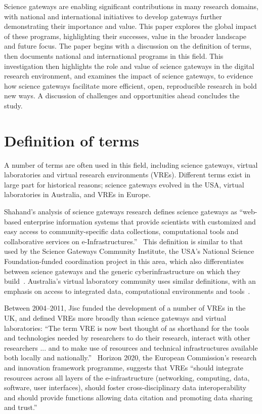 \documentclass[review]{elsarticle}
\begin{document}
Science gateways are enabling significant contributions in many research domains, with national and international initiatives to develop gateways further demonstrating their importance and value. 
This paper explores the global impact of these programs, highlighting their successes, value in the broader landscape and future focus. 
The paper begins with a discussion on the definition of terms, then documents national and international programs in this field. 
This investigation then highlights the role and value of science gateways in the digital research environment, and examines the impact of science gateways, to evidence how science gateways facilitate more efficient, open, reproducible research in bold new ways. 
A discussion of challenges and opportunities ahead concludes the study. 

\section{Definition of terms}

A number of terms are often used in this field, including science gateways, virtual laboratories and virtual research environments (VREs). Different terms exist in large part for historical reasons; science gateways evolved in the USA, virtual laboratories in Australia, and VREs in Europe. 

Shahand's analysis of science gateways research defines science gateways as ``web-based enterprise information systems that provide scientists with customized and easy access to community-specific data collections, computational tools and collaborative services on e-Infrastructures.''~\cite{shahand2015-1} This definition is similar to that used by the Science Gateways Community Institute, the USA's National Science Foundation-funded coordination project in this area, which also differentiates between science gateways and the generic cyberinfrastructure on which they build~\cite{what-is-sg-2}. Australia's virtual laboratory community uses similar definitions, with an emphasis on access to integrated data, computational environments and tools~\cite{nectar-impact-3}. 

Between 2004--2011, Jisc funded the development of a number of VREs in the UK, and defined VREs more broadly than science gateways and virtual laboratories: ``The term VRE is now best thought of as shorthand for the tools and technologies needed by researchers to do their research, interact with other researchers ... and to make use of resources and technical infrastructures available both locally and nationally.''~\cite{jisc-vre-4} Horizon 2020, the European Commission's research and innovation framework programme, suggests that VREs ``should integrate resources across all layers of the e-infrastructure (networking, computing, data, software, user interfaces), should foster cross-disciplinary data interoperability and should provide functions allowing data citation and promoting data sharing and trust.''~\cite{h2020-vre-5} 
\end{document}
